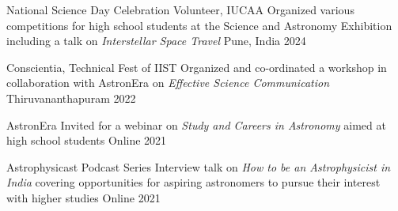 
\begin{cvhonors}


    \cvhonor
    {National Science Day Celebration Volunteer, IUCAA}
    {
    Organized various competitions for high school students at the Science and Astronomy Exhibition including a talk on \textit{Interstellar Space Travel}}
    {Pune, India}
    {2024}

    \cvhonor
    {Conscientia, Technical Fest of IIST}
    {Organized and co-ordinated a workshop in collaboration with AstronEra on \textit{Effective Science Communication}}
    {Thiruvananthapuram}
    {2022}

    \cvhonor
    {AstronEra}
    {Invited for a webinar on \textit{Study and Careers in Astronomy} aimed at high school students}
    {Online}
    {2021}

    \cvhonor
    {Astrophysicast Podcast Series}
    {Interview talk on \textit{How to be an Astrophysicist in India} covering opportunities for aspiring astronomers to pursue their interest with higher studies}
    {Online}
    {2021}
\end{cvhonors}